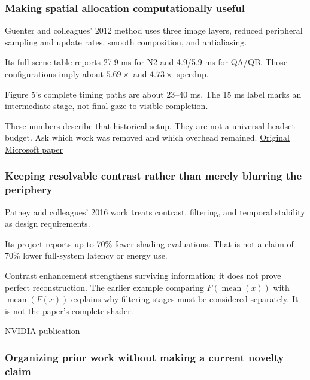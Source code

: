 \subsubsection{Making spatial allocation computationally useful}\label{04-visual-computing-ii-ch043-making-spatial-allocation-computationally-useful}

Guenter and colleagues' 2012 method uses three image layers, reduced peripheral sampling and update rates, smooth composition, and antialiasing.

Its full-scene table reports 27.9 ms for N2 and 4.9/5.9 ms for QA/QB. Those configurations imply about \(5.69\times\) and \(4.73\times\) speedup.

Figure 5's complete timing paths are about 23--40 ms. The 15 ms label marks an intermediate stage, not final gaze-to-visible completion.

These numbers describe that historical setup. They are not a universal headset budget. Ask which work was removed and which overhead remained. \href{https://www.microsoft.com/en-us/research/wp-content/uploads/2012/11/foveated_final15.pdf}{Original Microsoft paper}

\subsubsection{Keeping resolvable contrast rather than merely blurring the periphery}\label{04-visual-computing-ii-ch043-keeping-resolvable-contrast-rather-than-merely-blurring-the-periphery}

Patney and colleagues' 2016 work treats contrast, filtering, and temporal stability as design requirements.

Its project reports up to 70\% fewer shading evaluations. That is not a claim of 70\% lower full-system latency or energy use.

Contrast enhancement strengthens surviving information; it does not prove perfect reconstruction. The earlier example comparing \(F(\operatorname{mean}(x))\) with \(\operatorname{mean}(F(x))\) explains why filtering stages must be considered separately. It is not the paper's complete shader.

\href{https://research.nvidia.com/publication/2016-12_towards-foveated-rendering-gaze-tracked-virtual-reality}{NVIDIA publication}

\subsubsection{Organizing prior work without making a current novelty claim}\label{04-visual-computing-ii-ch043-organizing-prior-work-without-making-a-current-novelty-claim}

